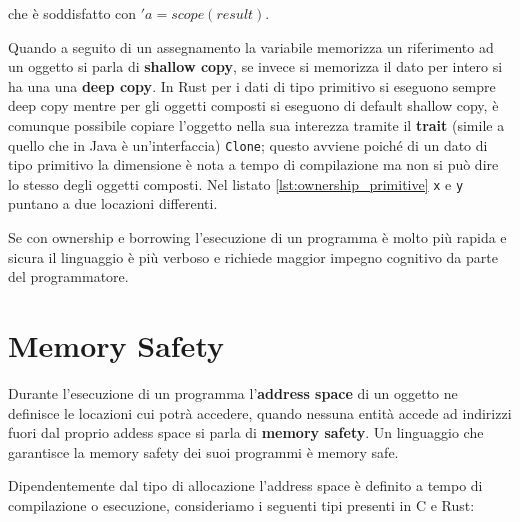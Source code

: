 \documentclass[Lau,binding=0.6cm]{sapthesis}
\newcommand{\textcode}[1]{\colorbox{backcolour}{\texttt{#1}}}
\begin{document}
che è soddisfatto con $ 'a = scope(result) $.




Quando a seguito di un assegnamento la variabile memorizza un riferimento ad un oggetto si parla di \textbf{shallow copy}, se invece si memorizza il dato per intero si ha una una \textbf{deep copy}. 
In Rust per i dati di tipo primitivo si eseguono sempre deep copy mentre per gli oggetti composti si eseguono di default shallow copy, è comunque possibile copiare l'oggetto nella sua interezza tramite il \textbf{trait} (simile a quello che in Java è un'interfaccia) \textcode{Clone}; questo avviene poiché di un dato di tipo primitivo la dimensione è nota a tempo di compilazione ma non si può dire lo stesso degli oggetti composti. Nel listato \ref{lst:ownership_primitive} \textcode{x} e \textcode{y} puntano a due locazioni differenti.



Se con ownership e borrowing l'esecuzione di un programma è molto più rapida e sicura il linguaggio è più verboso e richiede maggior impegno cognitivo da parte del programmatore. 


\chapter{Memory Safety} \label{chap:memory_safety}

Durante l'esecuzione di un programma l'\textbf{address space} di un oggetto ne definisce le locazioni cui potrà accedere, quando nessuna entità accede ad indirizzi fuori dal proprio addess space si parla di \textbf{memory safety}. 
Un linguaggio che garantisce la memory safety dei suoi programmi è memory safe.

Dipendentemente dal tipo di allocazione l'address space è definito a tempo di compilazione o esecuzione, consideriamo i seguenti tipi presenti in C e Rust:
\end{document}
